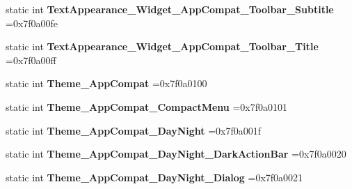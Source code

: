 \begin{DoxyCompactItemize}
\item 
\mbox{\label{classandroid_1_1support_1_1v7_1_1mediarouter_1_1R_1_1style_a9a061bfd8e4cb6eb811d3012c036a3a5}} 
static int {\bfseries Text\+Appearance\+\_\+\+Widget\+\_\+\+App\+Compat\+\_\+\+Toolbar\+\_\+\+Subtitle} =0x7f0a00fe
\item 
\mbox{\label{classandroid_1_1support_1_1v7_1_1mediarouter_1_1R_1_1style_ae49a065e495969ea89fe1950062bf464}} 
static int {\bfseries Text\+Appearance\+\_\+\+Widget\+\_\+\+App\+Compat\+\_\+\+Toolbar\+\_\+\+Title} =0x7f0a00ff
\item 
\mbox{\label{classandroid_1_1support_1_1v7_1_1mediarouter_1_1R_1_1style_a1e1cb320dd33a7d2c920b378f3b236f4}} 
static int {\bfseries Theme\+\_\+\+App\+Compat} =0x7f0a0100
\item 
\mbox{\label{classandroid_1_1support_1_1v7_1_1mediarouter_1_1R_1_1style_a199be047862be010492c95c579f1535d}} 
static int {\bfseries Theme\+\_\+\+App\+Compat\+\_\+\+Compact\+Menu} =0x7f0a0101
\item 
\mbox{\label{classandroid_1_1support_1_1v7_1_1mediarouter_1_1R_1_1style_ac57ce5f7b3a7ae9a80f421464c34b5be}} 
static int {\bfseries Theme\+\_\+\+App\+Compat\+\_\+\+Day\+Night} =0x7f0a001f
\item 
\mbox{\label{classandroid_1_1support_1_1v7_1_1mediarouter_1_1R_1_1style_a5102c89777b7e90685aca76411c55f45}} 
static int {\bfseries Theme\+\_\+\+App\+Compat\+\_\+\+Day\+Night\+\_\+\+Dark\+Action\+Bar} =0x7f0a0020
\item 
\mbox{\label{classandroid_1_1support_1_1v7_1_1mediarouter_1_1R_1_1style_a328aa8b1dd33d2130238d609ab1ecf5b}} 
static int {\bfseries Theme\+\_\+\+App\+Compat\+\_\+\+Day\+Night\+\_\+\+Dialog} =0x7f0a0021
\item 
\mbox{\label{classandroid_1_1support_1_1v7_1_1mediarouter_1_1R_1_1style_a3068bd9094529af970f4c93fbbd2b807}} 

\end{DoxyCompactItemize}

